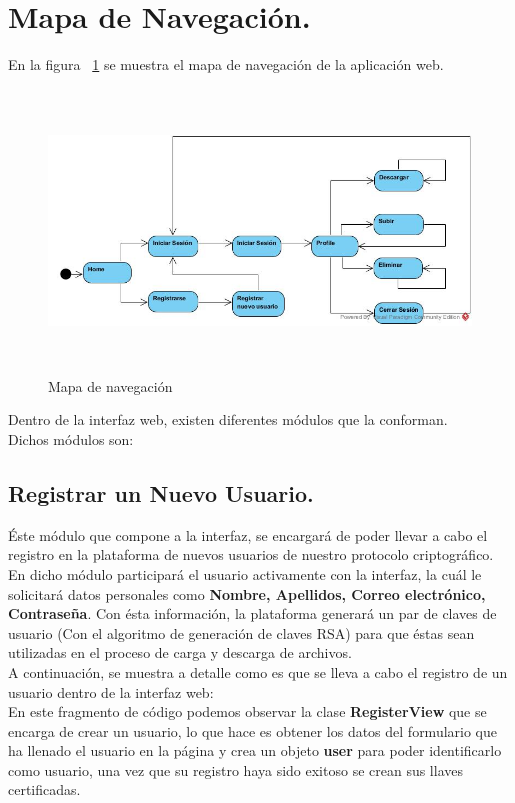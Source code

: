 \section{Mapa de Navegación. }
En la figura  ~\ref{fig:6-1-1} se muestra el mapa de navegación de la aplicación web.

			\begin{figure}[H]
			\centering
			\includegraphics[width=14cm, height=7.5cm]{./images/MapaDeNavegacion.jpg}
			\caption{Mapa de navegación}
			\label{fig:6-1-1} 
			\end{figure}

Dentro de la interfaz web, existen diferentes módulos que la conforman. \\ Dichos módulos son: 

\subsection{Registrar un Nuevo Usuario. } 
Éste módulo que compone a la interfaz, se encargará de poder llevar a cabo el registro en la plataforma de nuevos usuarios de nuestro protocolo criptográfico. En dicho módulo participará el usuario activamente con la interfaz, la cuál le solicitará datos personales como \textbf{Nombre, Apellidos, Correo electrónico, Contraseña}. Con ésta información, la plataforma generará un par de claves de usuario (Con el algoritmo de generación de claves RSA) para que éstas sean utilizadas en el proceso de carga y descarga de archivos. \\ 

A continuación, se muestra a detalle como es que se lleva a cabo el registro de un usuario dentro de la interfaz web: \\ 

En este fragmento de código podemos observar la clase \textbf{RegisterView} que se encarga de crear un usuario, lo que hace es obtener los datos del formulario que ha llenado el usuario en la página y crea un objeto \textbf{user} para poder identificarlo como usuario, una vez que su registro haya sido exitoso se crean sus llaves certificadas.

